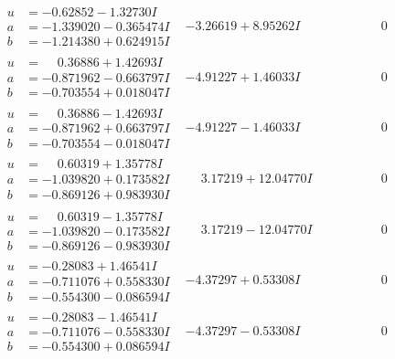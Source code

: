 \documentclass[1p]{elsarticle_modified}
\theoremstyle{definition}
\begin{document}
$$\begin{array}{c|c|c}
\begin{aligned}
u &= -0.62852 - 1.32730 I \\
a &= -1.339020 - 0.365474 I \\
b &= -1.214380 + 0.624915 I\end{aligned}
 & -3.26619 + 8.95262 I & \phantom{-0.000000 } 0 \\ \hline\begin{aligned}
u &= \phantom{-}0.36886 + 1.42693 I \\
a &= -0.871962 - 0.663797 I \\
b &= -0.703554 + 0.018047 I\end{aligned}
 & -4.91227 + 1.46033 I & \phantom{-0.000000 } 0 \\ \hline\begin{aligned}
u &= \phantom{-}0.36886 - 1.42693 I \\
a &= -0.871962 + 0.663797 I \\
b &= -0.703554 - 0.018047 I\end{aligned}
 & -4.91227 - 1.46033 I & \phantom{-0.000000 } 0 \\ \hline\begin{aligned}
u &= \phantom{-}0.60319 + 1.35778 I \\
a &= -1.039820 + 0.173582 I \\
b &= -0.869126 + 0.983930 I\end{aligned}
 & \phantom{-}3.17219 + 12.04770 I & \phantom{-0.000000 } 0 \\ \hline\begin{aligned}
u &= \phantom{-}0.60319 - 1.35778 I \\
a &= -1.039820 - 0.173582 I \\
b &= -0.869126 - 0.983930 I\end{aligned}
 & \phantom{-}3.17219 - 12.04770 I & \phantom{-0.000000 } 0 \\ \hline\begin{aligned}
u &= -0.28083 + 1.46541 I \\
a &= -0.711076 + 0.558330 I \\
b &= -0.554300 - 0.086594 I\end{aligned}
 & -4.37297 + 0.53308 I & \phantom{-0.000000 } 0 \\ \hline\begin{aligned}
u &= -0.28083 - 1.46541 I \\
a &= -0.711076 - 0.558330 I \\
b &= -0.554300 + 0.086594 I\end{aligned}
 & -4.37297 - 0.53308 I & \phantom{-0.000000 } 0 \\ \hline\begin{aligned}

\end{aligned}
\end{array}$$
\end{document}
